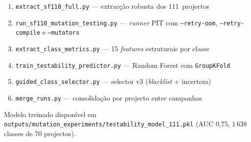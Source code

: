 \documentclass[12pt,a4paper]{article}
\begin{document}
\begin{enumerate}
  \item \texttt{extract\_sf110\_full.py} --- extracção robusta dos 111~projectos
  \item \texttt{run\_sf110\_mutation\_testing.py} --- \textit{runner} PIT com
        \texttt{--retry-oom}, \texttt{--retry-compile} e \texttt{--mutators}
  \item \texttt{extract\_class\_metrics.py} --- 15 \textit{features} estruturais
        por classe
  \item \texttt{train\_testability\_predictor.py} --- Random Forest com
        \texttt{GroupKFold}
  \item \texttt{guided\_class\_selector.py} --- selector v3 (\textit{blacklist} +
        incerteza)
  \item \texttt{merge\_runs.py} --- consolidação por projecto entre campanhas
\end{enumerate}

Modelo treinado disponível em
\texttt{outputs/mutation\_experiments/testability\_model\_111.pkl} (AUC 0,75,
1\,638 classes de 70 projectos).
\end{document}
